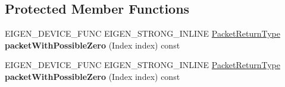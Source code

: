 \subsection*{Protected Member Functions}
\begin{DoxyCompactItemize}
\item 
\mbox{\label{struct_eigen_1_1_tensor_evaluator_3_01const_01_tensor_image_patch_op_3_01_rows_00_01_cols_00_01_arg_type_01_4_00_01_device_01_4_a61ff38212d13bd623c65d35b9aaa2716}} 
E\+I\+G\+E\+N\+\_\+\+D\+E\+V\+I\+C\+E\+\_\+\+F\+U\+NC E\+I\+G\+E\+N\+\_\+\+S\+T\+R\+O\+N\+G\+\_\+\+I\+N\+L\+I\+NE \hyperlink{group___sparse_core___module}{Packet\+Return\+Type} {\bfseries packet\+With\+Possible\+Zero} (Index index) const
\item 
\mbox{\label{struct_eigen_1_1_tensor_evaluator_3_01const_01_tensor_image_patch_op_3_01_rows_00_01_cols_00_01_arg_type_01_4_00_01_device_01_4_a61ff38212d13bd623c65d35b9aaa2716}} 
E\+I\+G\+E\+N\+\_\+\+D\+E\+V\+I\+C\+E\+\_\+\+F\+U\+NC E\+I\+G\+E\+N\+\_\+\+S\+T\+R\+O\+N\+G\+\_\+\+I\+N\+L\+I\+NE \hyperlink{group___sparse_core___module}{Packet\+Return\+Type} {\bfseries packet\+With\+Possible\+Zero} (Index index) const
\end{DoxyCompactItemize}

